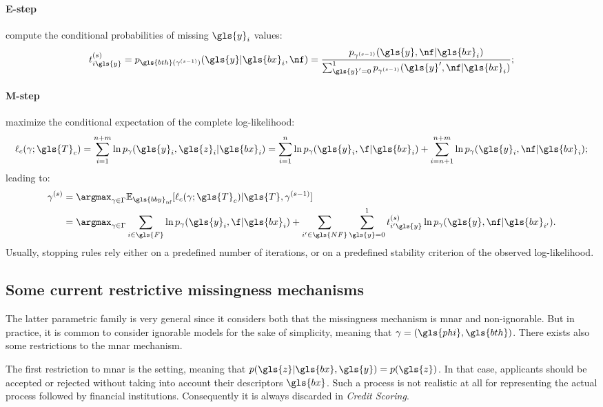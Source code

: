 \paragraph{E-step} compute the conditional probabilities of missing $\gls{y}_i$ values:
\begin{equation}
t_{i\gls{y}}^{(s)} = p_{\gls{bth}(\gamma^{(s-1)})}(\gls{y}|\gls{bx}_i,\nf) = \frac{p_{\gamma^{(s-1)}}(\gls{y}, \nf|\gls{bx}_i)}{\sum_{\gls{y}' = 0}^{1} p_{\gamma^{(s-1)}}(\gls{y}', \nf|\gls{bx}_i)};
\end{equation}
\paragraph{M-step} maximize the conditional expectation of the complete log-likelihood:
\begin{equation}\label{eq:like.c}
\ell_c(\gamma;\gls{T}_c) = \sum_{i=1}^{n+m}\ln p_{\gamma}(\gls{y}_i,\gls{z}_i | \gls{bx}_i) = \sum_{i=1}^{n}\ln p_{\gamma}(\gls{y}_i,\f | \gls{bx}_i) + \sum_{i=n+1}^{n+m}\ln p_{\gamma}(\gls{y}_i,\nf | \gls{bx}_i);
\end{equation}
leading to:
\begin{align*}
\gamma^{(s)} & = \argmax_{\gamma \in \Gamma} \mathbb{E}_{\gls{bby}_{\text{nf}}} [\ell_c(\gamma;\gls{T}_c) | \gls{T},\gamma^{(s-1)}] \\
& = \argmax_{\gamma \in \Gamma} \sum_{i\in \gls{F}} \ln p_{\gamma}(\gls{y}_i, \f|\gls{bx}_i) +  \sum_{i'\in \gls{NF}}\sum_{\gls{y} = 0}^{1}t_{i'\gls{y}}^{(s)} \ln p_{\gamma}(\gls{y}, \nf | \gls{bx}_{i'}).
\end{align*}
Usually, stopping rules rely either on a predefined number of iterations, or on a predefined stability criterion of the observed log-likelihood.

\subsection{Some current restrictive missingness mechanisms}
\label{sec:mechanisms}

The latter parametric family is very general since it considers both that the missingness mechanism is \gls{mnar} and non-ignorable. But in practice, it is common to consider ignorable models for the sake of simplicity, meaning that $\gamma= (\gls{phi},\gls{bth})$. There exists also some restrictions to the \gls{mnar} mechanism. 

The first restriction to \gls{mnar} is the  setting, meaning that $p(\gls{z}| \gls{bx},\gls{y}) = p(\gls{z})$. In that case, applicants should be accepted or rejected without taking into account their descriptors $\gls{bx}$. Such a process is not realistic at all for representing the actual process followed by financial institutions. Consequently it is always discarded in \textit{Credit Scoring}.

